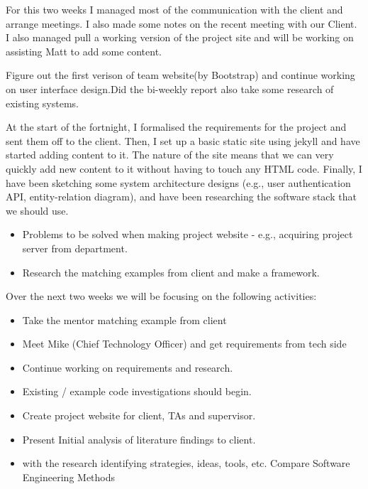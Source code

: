 \documentclass[11pt]{report}
\begin{document}
\bigskip
{}
\smallskip

\noindent
For this two weeks I managed most of the communication with the client and arrange meetings. I also made some notes on the recent meeting with our Client. I also managed pull a working version of the project site and will be working on assisting Matt to add some content.\\

\bigskip
{}
\smallskip

\noindent
Figure out the first verison of team website(by Bootstrap) and continue working on user interface design.Did the bi-weekly report also take some research of existing systems.\\

\pagebreak
\bigskip
{}
\smallskip

\noindent
At the start of the fortnight, I formalised the requirements for the project and sent them off to the client. Then, I set up a basic static site using jekyll and have started adding content to it. The nature of the site means that we can very quickly add new content to it without having to touch any HTML code. Finally, I have been sketching some system architecture designs (e.g., user authentication API, entity-relation diagram), and have been researching the software stack that we should use.\\

\bigskip
{}
\smallskip

\noindent

\begin{itemize}
    \item Problems to be solved when making project website - e.g., acquiring project server from department.
    \item Research the matching examples from client and make a framework.
\end{itemize}

\bigskip
{}
\smallskip

\noindent
Over the next two weeks we will be focusing on the following activities:

\begin{itemize}
 \item Take the mentor matching example from client
 \item Meet Mike (Chief Technology Officer) and get requirements from tech side
 \item Continue working on requirements and research.
 \item Existing / example code investigations should begin.
 \item Create project website for client, TAs and supervisor.
 \item Present Initial analysis of literature findings to client.
 \item with the research identifying strategies, ideas, tools, etc. Compare Software Engineering Methods
\end{itemize}
\end{document}

